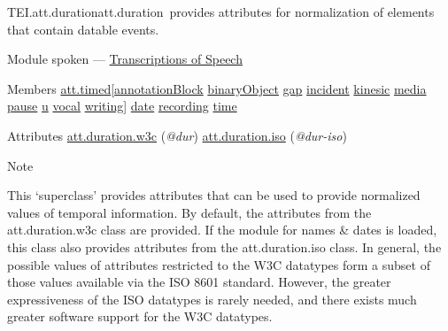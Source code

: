 \begin{reflist}
\item[]\begin{specHead}{TEI.att.duration}{att.duration} provides attributes for normalization of elements that contain datable events.\end{specHead} 
    \item[{Module}]
  spoken — \hyperref[TS]{Transcriptions of Speech}
    \item[{Members}]
  \hyperref[TEI.att.timed]{att.timed}[\hyperref[TEI.annotationBlock]{annotationBlock} \hyperref[TEI.binaryObject]{binaryObject} \hyperref[TEI.gap]{gap} \hyperref[TEI.incident]{incident} \hyperref[TEI.kinesic]{kinesic} \hyperref[TEI.media]{media} \hyperref[TEI.pause]{pause} \hyperref[TEI.u]{u} \hyperref[TEI.vocal]{vocal} \hyperref[TEI.writing]{writing}] \hyperref[TEI.date]{date} \hyperref[TEI.recording]{recording} \hyperref[TEI.time]{time}
    \item[{Attributes}]
  \hyperref[TEI.att.duration.w3c]{att.duration.w3c} (\textit{@dur}) \hyperref[TEI.att.duration.iso]{att.duration.iso} (\textit{@dur-iso}) 
    \item[{Note}]
  \par
This ‘superclass’ provides attributes that can be used to provide normalized values of temporal information. By default, the attributes from the \textsf{att.duration.w3c} class are provided. If the module for names \& dates is loaded, this class also provides attributes from the \textsf{att.duration.iso} class. In general, the possible values of attributes restricted to the W3C datatypes form a subset of those values available via the ISO 8601 standard. However, the greater expressiveness of the ISO datatypes is rarely needed, and there exists much greater software support for the W3C datatypes.
\end{reflist}  

